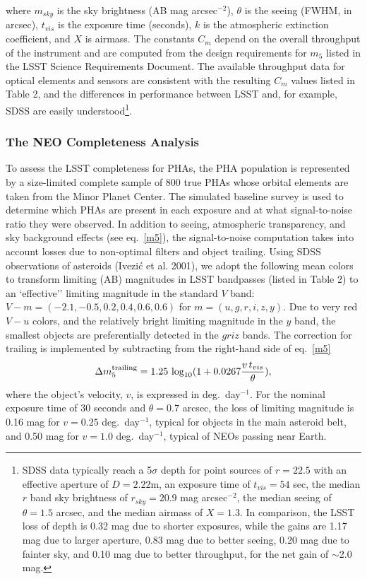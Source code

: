 \documentclass{emulateapj}
\newcommand{\B}[1]{{#1}}
\begin{document}
where $m_{sky}$ is the sky brightness (AB mag arcsec$^{-2}$), $\theta$ is 
the seeing (FWHM, in arcsec), $t_{vis}$ is the exposure time (seconds),
$k$ is the atmospheric extinction coefficient, and $X$ is airmass. 
The constants $C_m$ depend on the overall throughput of the instrument
and are 
\B{computed from the design requirements for $m_5$ listed in the
LSST Science Requirements Document. The available throughput data for
optical elements and sensors are consistent with the resulting $C_m$ values 
listed in Table 2, and the differences in performance between LSST and,
for example, SDSS are easily understood\footnote{SDSS data 
typically reach a 5$\sigma$ depth for point sources of $r=22.5$ 
with an effective aperture of $D=2.22$m, an exposure time of $t_{vis}=54$ 
sec, the median $r$ band sky brightness of $r_{sky}=20.9$ mag arcsec$^{-2}$, 
the median seeing of $\theta=1.5$ arcsec, and the median airmass of $X=1.3$.
In comparison, the LSST loss of depth is 0.32 mag due to shorter exposures,
while the gains are 1.17 mag due to larger aperture, 0.83 mag due to better 
seeing, 0.20 mag due to fainter sky, and 0.10 mag due to better throughput,
for the net gain of $\sim$2.0 mag.}.}


\subsubsection{   The NEO Completeness Analysis    } 
\label{Sec:NEOc}
To assess the LSST completeness for PHAs, the PHA 
population is represented by a size-limited complete sample of 800 true
PHAs whose orbital elements are taken from the Minor Planet Center.
The simulated baseline survey is used to determine which PHAs are present in
each exposure and at what signal-to-noise ratio they were observed. In 
addition to  seeing, atmospheric transparency, and sky background effects
(see eq.~\ref{m5}), the signal-to-noise computation takes into account losses 
due to non-optimal filters and object trailing. Using SDSS observations
of asteroids (Ivezi\'c et al. 2001), we adopt the following mean colors to 
transform limiting (AB) magnitudes in LSST bandpasses (listed in Table 2)
to an `effective'' limiting magnitude in the standard $V$ band: 
$V-m=(-2.1, -0.5, 0.2, 0.4, 0.6, 0.6)$ for $m=(u,g,r,i,z,y)$. Due to 
very red $V-u$ colors, and the relatively bright limiting magnitude in the $y$ 
band, the smallest objects are preferentially detected in the $griz$ bands.
The correction for trailing is implemented by subtracting from the right-hand 
side of eq.~\ref{m5}
\begin{equation}
 \Delta m_5^{\rm trailing} = 1.25\,\log_{10}(1+0.0267{v \,t_{vis} \over \theta}),
\end{equation}
where the object's velocity, $v$, is expressed in deg.~day$^{-1}$. For the nominal
exposure time of 30 seconds and $\theta=0.7$ arcsec, the loss of limiting 
magnitude is 0.16 mag for $v=0.25$ deg.~day$^{-1}$, typical for objects in the main 
asteroid belt, and 0.50 mag for $v=1.0$ deg.~day$^{-1}$, typical of NEOs passing
near Earth. 
\end{document}
